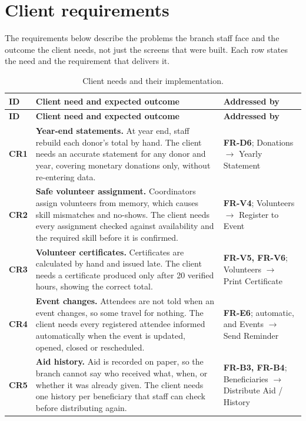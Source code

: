 \section{Client requirements}

The requirements below describe the problems the branch staff face and the outcome the client needs, not just the screens that were built. Each row states the need and the requirement that delivers it.

\begingroup
\footnotesize
\renewcommand{\arraystretch}{1.25}
\begin{xltabular}{\textwidth}{@{}L{0.06\textwidth}YL{0.28\textwidth}@{}}
\caption{Client needs and their implementation.}\label{tab:client}\\
\toprule
\textbf{ID} & \textbf{Client need and expected outcome} & \textbf{Addressed by} \\
\midrule
\endfirsthead
\toprule
\textbf{ID} & \textbf{Client need and expected outcome} & \textbf{Addressed by} \\
\midrule
\endhead
\bottomrule
\endlastfoot
\textbf{CR1} & \textbf{Year-end statements.} At year end, staff rebuild each donor's total by hand. The client needs an accurate statement for any donor and year, covering monetary donations only, without re-entering data. & \textbf{FR-D6}; Donations \(\rightarrow\) Yearly Statement \\
\addlinespace[2pt]
\textbf{CR2} & \textbf{Safe volunteer assignment.} Coordinators assign volunteers from memory, which causes skill mismatches and no-shows. The client needs every assignment checked against availability and the required skill before it is confirmed. & \textbf{FR-V4}; Volunteers \(\rightarrow\) Register to Event \\
\addlinespace[2pt]
\textbf{CR3} & \textbf{Volunteer certificates.} Certificates are calculated by hand and issued late. The client needs a certificate produced only after 20 verified hours, showing the correct total. & \textbf{FR-V5, FR-V6}; Volunteers \(\rightarrow\) Print Certificate \\
\addlinespace[2pt]
\textbf{CR4} & \textbf{Event changes.} Attendees are not told when an event changes, so some travel for nothing. The client needs every registered attendee informed automatically when the event is updated, opened, closed or rescheduled. & \textbf{FR-E6}; automatic, and Events \(\rightarrow\) Send Reminder \\
\addlinespace[2pt]
\textbf{CR5} & \textbf{Aid history.} Aid is recorded on paper, so the branch cannot say who received what, when, or whether it was already given. The client needs one history per beneficiary that staff can check before distributing again. & \textbf{FR-B3, FR-B4}; Beneficiaries \(\rightarrow\) Distribute Aid / History \\

\end{xltabular}
